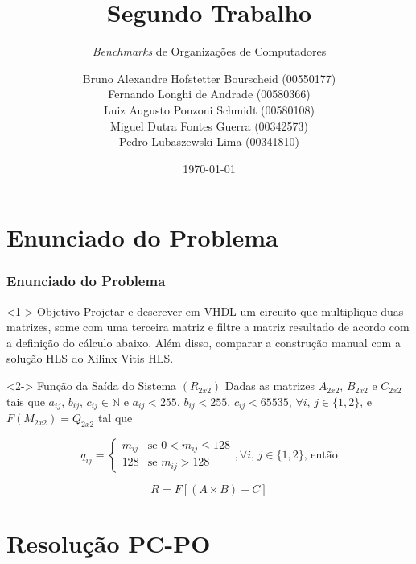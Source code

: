 \documentclass{beamer}
\title[Segundo Trabalho]{Segundo Trabalho}
\subtitle{\textit{Benchmarks} de Organizações de Computadores}
\author[Grupo 13]{Bruno Alexandre Hofstetter Bourscheid (00550177)
              \\ Fernando Longhi de Andrade (00580366)
              \\ Luiz Augusto Ponzoni Schmidt (00580108)
              \\ Miguel Dutra Fontes Guerra (00342573)
              \\ Pedro Lubaszewski Lima (00341810)}
\institute[]{INF01113\\Organização De Computadores B}
\date[\today]{\today}
\begin{document}
    \begin{frame}
        \maketitle
    \end{frame}

    \section{Enunciado do Problema}
    \begin{frame}
        \frametitle{Enunciado do Problema}

        \begin{block}<1->
            {Objetivo}
            Projetar e descrever em VHDL um
            circuito que multiplique duas matrizes,
            some com uma terceira matriz e filtre a
            matriz resultado de acordo com a definição
            do cálculo abaixo. Além disso, comparar
            a construção manual com a solução HLS do
            Xilinx Vitis HLS.
        \end{block}

        \begin{block}<2->
            {Função da Saída do Sistema $ (R_{2x2}) $}
            Dadas as matrizes $ A_{2x2} $, $ B_{2x2} $
            e $ C_{2x2} $ tais que $ a_{ij} $, $ b_{ij} $,
            $ c_{ij} \in \mathbb{N} $ e $ a_{ij} < 255 $,
            $ b_{ij} < 255 $, $ c_{ij} < 65535 $, $ \forall i $,
            $ j \in \{ 1,2 \}$, e $ F(M_{2x2}) = Q_{2x2} $ tal que

            $$ q_{ij} = 
                \begin{cases}
                    m_{ij} & \text{se } 0 < m_{ij} \leqslant 128 \\
                    128 & \text{se } m_{ij} > 128
                \end{cases}
                \text{,} \,\forall i \text{, } j \in \{ 1,2 \} \text{, então}
            $$

            $$ R = F[(A \times B) + C] $$
        \end{block}
    \end{frame}

    \section{Resolução PC-PO}
\end{document}
